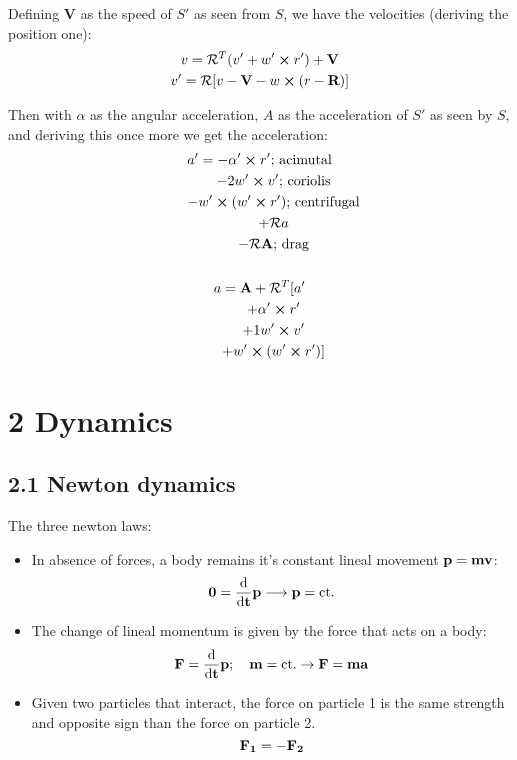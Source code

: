 \documentclass[a4paper,landscape,10pt]{cheatsheet}
\begin{document}
Defining $\textbf{V}$ as the speed of $S'$ as seen from $S$, we have the velocities (deriving the position one):
\begin{gather*}
  v=\mathcal{R}^T(v'+w'\cross r') + \textbf{V} \\
  v'=\mathcal{R}[v-\textbf{V}-w\cross(r-\textbf{R})]
\end{gather*}

Then with $\alpha$ as the angular acceleration, $A$ as the acceleration of $S'$ as seen by $S$, and deriving this once
more we get the acceleration:
\begin{gather*}
  a' = -\alpha'\cross r' \text{; acimutal}\\
  \quad\quad - 2w'\cross v' \text{; coriolis}\\
  \quad\quad - w'\cross (w'\cross r') \text{; centrifugal}\\
  \quad\quad + \mathcal{R}a \\
  \quad\quad -\mathcal{R}\textbf{A} \text{; drag}\\
  \\
  a = \textbf{A} + \mathcal{R}^T[a' \\
  \quad\quad +\alpha'\cross r' \\
  \quad\quad + 1w'\cross v' \\
  \quad\quad + w'\cross (w'\cross r')] \\
\end{gather*}


\section{2 Dynamics}
\subsection*{2.1 Newton dynamics}
The three newton laws:
\begin{itemize}
  \item In absence of forces, a body remains it's constant lineal movement $\bf{p} = m\bf{v}$:
        $$
          \bf{0} = \derivative{}{t}\bf{p} \longrightarrow \bf{p} = \text{ct.}
        $$
  \item The change of lineal momentum is given by the force that acts on a body:
        $$
          \bf{F} = \derivative{}{t}\bf{p}; \quad m=\text{ct.} \rightarrow \bf{F} = m\bf{a}
        $$
  \item Given two particles that interact, the force on particle 1 is the same strength and opposite sign than the force
        on particle 2.
        $$
          \bf{F}_1 = -\bf{F}_2
        $$
\end{itemize}
\end{document}
